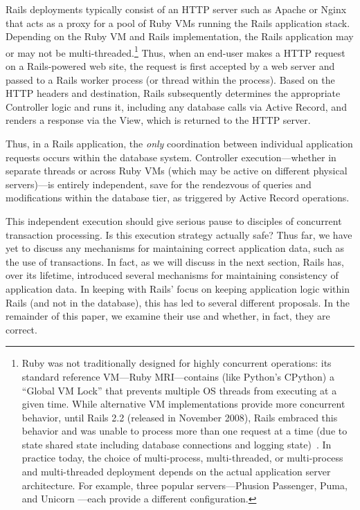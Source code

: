 Rails deployments typically consist of an HTTP server such as Apache or Nginx that acts as a proxy for a pool of Ruby VMs running the Rails application stack. Depending on the Ruby VM and Rails implementation, the Rails application may or may not be multi-threaded.\footnote{Ruby was not traditionally designed for highly concurrent operations: its standard reference VM---Ruby MRI---contains (like Python's CPython) a ``Global VM Lock'' that prevents multiple OS threads from executing at a given time. While alternative VM implementations provide more concurrent behavior, until Rails 2.2 (released in November 2008), Rails embraced this behavior and was unable to process more than one request at a time (due to state shared state including database connections and logging state)~\cite{rails-threading}. In practice today, the choice of multi-process, multi-threaded, or multi-process and multi-threaded deployment depends on the actual application server architecture. For example, three popular servers---Phusion Passenger, Puma, and Unicorn ---each provide a different configuration.} Thus, when an end-user makes a HTTP request on a Rails-powered web site, the request is first accepted by a web server and passed to a Rails worker process (or thread within the process). Based on the HTTP headers and destination, Rails subsequently determines the appropriate Controller logic and runs it, including any database calls via Active Record, and renders a response via the View, which is returned to the HTTP server.

Thus, in a Rails application, the \textit{only} coordination between individual application requests occurs within the database system. Controller execution---whether in separate threads or across Ruby VMs (which may be active on different physical servers)---is entirely independent, save for the rendezvous of queries and modifications within the database tier, as triggered by Active Record operations.

This independent execution should give serious pause to disciples of concurrent transaction processing. Is this execution strategy actually safe? Thus far, we have yet to discuss any mechanisms for maintaining correct application data, such as the use of transactions. In fact, as we will discuss in the next section, Rails has, over its lifetime, introduced several mechanisms for maintaining consistency of application data. In keeping with Rails' focus on keeping application logic within Rails (and not in the database), this has led to several different proposals. In the remainder of this paper, we examine their use and whether, in fact, they are correct.



